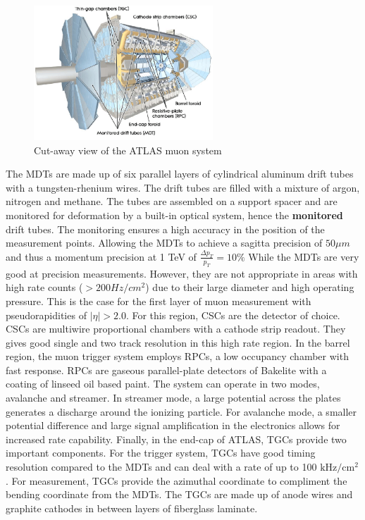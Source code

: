 \begin{figure}[h]
\begin{center}
\includegraphics*[width=0.60\textwidth] {figures/muonsys}
\caption[ATLAS muon system]{Cut-away view of the ATLAS muon system \cite{Love:2011qua}}
\label{fig:muon}
\end{center}
\end{figure}

\indent The MDTs are made up of six parallel layers of cylindrical aluminum drift tubes with a tungsten-rhenium wires. The drift tubes are filled with a mixture of argon, nitrogen and methane. The tubes are assembled on a support spacer and are monitored for deformation by a built-in optical system, hence the \textbf{monitored} drift tubes. The monitoring ensures a high accuracy in the position of the measurement points. Allowing the MDTs to achieve a sagitta precision of ${50\mu{m}}$ and thus a momentum precision at 1 TeV of ${\frac{\Delta{p_{T}}}{p_{T}}=10\%}$ \newline
\indent While the MDTs are very good at precision measurements. However, they are not appropriate in areas with high rate counts (${> 200 Hz/cm^{2}}$) due to their large diameter and high operating pressure. This is the case for the first layer of muon measurement with pseudorapidities of ${|\eta{}|>2.0}$. For this region, CSCs are the detector of choice. CSCs are multiwire proportional chambers with a cathode strip readout. They gives good single and two track resolution in this high rate region.\newline
\indent In the barrel region, the muon trigger system employs RPCs, a low occupancy chamber with fast response. RPCs are gaseous parallel-plate detectors of Bakelite with a coating of linseed oil based paint. The system can operate in two modes, avalanche and streamer.  In streamer mode, a large potential across the plates generates a discharge around the ionizing particle. For avalanche mode, a smaller potential difference and large signal amplification in the electronics allows for increased rate capability.\newline
\indent Finally, in the end-cap of ATLAS, TGCs provide two important components. For the trigger system, TGCs have good timing resolution compared to the MDTs and can deal with a rate of up to 100 ${\mathrm{kHz}/\mathrm{cm}^{2}}$. For measurement, TGCs provide the azimuthal coordinate to compliment the bending coordinate from the MDTs. The TGCs are made up of anode wires and graphite cathodes in between layers of fiberglass laminate. 
